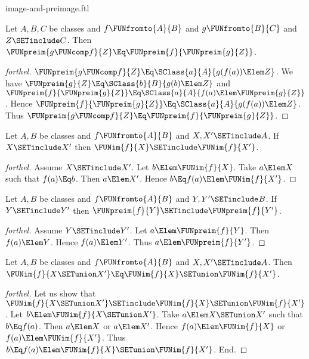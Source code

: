 \documentclass{stex}
\begin{document}
\begin{smodule}{image-and-preimage.ftl}
\begin{proposition}[forthel]
  Let $A, B, C$ be classes and $f \FUNfromto{A}{B}$ and $g \FUNfromto{B}{C}$ and $Z \SETinclude C$.
  Then $\FUNpreim{g \FUNcomp f}{Z} \Eq \FUNpreim{f}{\FUNpreim{g}{Z}}$.
\end{proposition}
\begin{proof}[forthel]
  $\FUNpreim{g \FUNcomp f}{Z} \Eq \SClass{a}{A}{g(f(a)) \Elem Z}$.
  We have $\FUNpreim{g}{Z} \Eq \SClass{b}{B}{g(b) \Elem Z}$ and $\FUNpreim{f}{\FUNpreim{g}{Z}} \Eq \SClass{a}{A}{f(a) \Elem \FUNpreim{g}{Z}}$.
  Hence $\FUNpreim{f}{\FUNpreim{g}{Z}} \Eq \SClass{a}{A}{g(f(a)) \Elem Z}$.
  Thus $\FUNpreim{g \FUNcomp f}{Z} \Eq \FUNpreim{f}{\FUNpreim{g}{Z}}$.
\end{proof}

\begin{proposition}[forthel]
  Let $A, B$ be classes and $f \FUNfromto{A}{B}$ and $X, X' \SETinclude A$.
  If $X \SETinclude X'$ then $\FUNim{f}{X} \SETinclude \FUNim{f}{X'}$.
\end{proposition}
\begin{proof}[forthel]
  Assume $X \SETinclude X'$.
  Let $b \Elem \FUNim{f}{X}$.
  Take $a \Elem X$ such that $f(a) \Eq b$.
  Then $a \Elem X'$.
  Hence $b \Eq f(a) \Elem \FUNim{f}{X'}$.
\end{proof}

\begin{proposition}[forthel]
  Let $A, B$ be classes and $f \FUNfromto{A}{B}$ and $Y, Y' \SETinclude B$.
  If $Y \SETinclude Y'$ then $\FUNpreim{f}{Y} \SETinclude \FUNpreim{f}{Y'}$.
\end{proposition}
\begin{proof}[forthel]
  Assume $Y \SETinclude Y'$.
  Let $a \Elem \FUNpreim{f}{Y}$.
  Then $f(a) \Elem Y$.
  Hence $f(a) \Elem Y'$.
  Thus $a \Elem \FUNpreim{f}{Y'}$.
\end{proof}

\begin{proposition}[forthel]
  Let $A, B$ be classes and $f \FUNfromto{A}{B}$ and $X, X' \SETinclude A$.
  Then $\FUNim{f}{X \SETunion X'} \Eq \FUNim{f}{X} \SETunion \FUNim{f}{X'}$.
\end{proposition}
\begin{proof}[forthel]
  Let us show that $\FUNim{f}{X \SETunion X'} \SETinclude \FUNim{f}{X} \SETunion \FUNim{f}{X'}$.
    Let $b \Elem \FUNim{f}{X \SETunion X'}$.
    Take $a \Elem X \SETunion X'$ such that $b \Eq f(a)$.
    Then $a \Elem X$ or $a \Elem X'$.
    Hence $f(a) \Elem \FUNim{f}{X}$ or $f(a) \Elem \FUNim{f}{X'}$.
    Thus $b \Eq f(a) \Elem \FUNim{f}{X} \SETunion \FUNim{f}{X'}$.
  End.


\end{proof}
\end{smodule}
\end{document}
